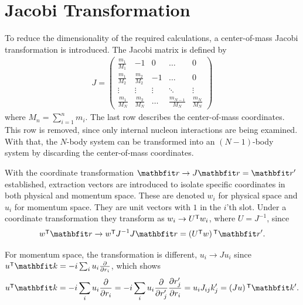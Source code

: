 \documentclass[a4paper,oneside,article,12pt]{memoir}
\begin{document}
\newpage
\chapter{Jacobi Transformation} \label{ch:jac}
To reduce the dimensionality of the required calculations, a center-of-mass Jacobi transformation is introduced. 
The Jacobi matrix is defined by 
\begin{align}
    J = \begin{pmatrix} 
    \frac{m_1}{M_1} & -1 & 0 & \dots & 0 \\ 
    \frac{m_1}{M_2} & \frac{m_2}{M_2} & -1  & \dots & 0 \\ 
    \vdots & \vdots & \vdots & \ddots  & \vdots \\
    \frac{m_1}{M_N} & \frac{m_2}{M_N} & \dots & \frac{m_{N-1}}{M_N} & \frac{m_N}{M_N}
    \end{pmatrix}
\end{align}
where $M_n = \sum_{i=1}^{n}m_i$. The last row describes the center-of-mass coordinates. This row is removed, since only internal nucleon interactions are being examined. With that, the $N$-body system can be transformed into an $(N-1)$-body system by discarding the center-of-mass coordinates.

With the coordinate transformation $\v{r} \rightarrow J\v{r} = \v{r}'$ established, extraction vectors are introduced to isolate specific coordinates in both physical and momentum space. 
These are denoted $w_i$ for physical space and $u_i$ for momentum space. They are unit vectors with $1$ in the $i$'th slot. 
Under a coordinate transformation they transform as $w_i \rightarrow U\tr w_i$, where $U=J^{-1}$, since 
\begin{align}
    w\tr \v{r} \rightarrow w\tr J^{-1}J\v{r} = \br{U\tr w}\tr \v{r}'.
\end{align}

For momentum space, the transformation is different, \mbox{$u_i \rightarrow Ju_i$} since $u\tr \v{k} = -i\sum_{i}u_i\frac{\dd}{\dd r_i}$, which shows
\begin{align}
    u\tr \v{k} = -i\sum_{i}u_i\frac{\dd}{\dd r_i} = -i\sum_{i}u_i\frac{\dd}{\dd r'_j} \frac{\dd r'_j}{\dd r_i} = u_i J_{ij}k_j'=\br{Ju}\tr \v{k}'. 
\end{align}
\end{document}
